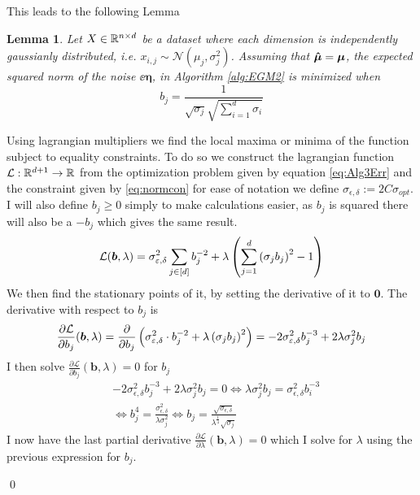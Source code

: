 \documentclass[a4paper,12pt]{article}
\renewenvironment{proof}{{\textit{Proof} \\}}{\qed}
\newtheorem{lemma}{Lemma}[section]
\begin{document}
\noindent This leads to the following Lemma

\begin{lemma}
\label{lem:Optb}
Let $X \in \mathbb{R}^{n \times d}$ be a dataset where each dimension is independently gaussianly distributed, i.e.
$x_{i,j} \sim \mathcal{N}(\mu_j, \sigma_j^2)$.
Assuming that $\bm{\hat{\mu}} = \bm{\mu}$, the expected squared norm of the noise $\ee{\bm{\eta}}$, 
in Algorithm \ref{alg:EGM2} is minimized when
\[
    b_j = \frac{1}{\sqrt{\sigma_j} \sqrt{\sum_{i=1}^d \sigma_i}}
\]
\end{lemma}
\begin{proof}
Using lagrangian multipliers we find the local maxima or 
minima of the function subject to equality constraints.
To do so we construct the lagrangian function $\mathcal{L}: \mathbb{R}^{d+1} \rightarrow \mathbb{R}$ from the optimization problem given by
equation \eqref{eq:Alg3Err} and the constraint given by \eqref{eq:normcon} for ease of notation we define 
$\sigma_{\epsilon, \delta} := 2C\sigma_{opt}$. 
I will also define $b_j \ge 0$ simply to make calculations easier, 
as $b_j$ is squared there will also be a $-b_j$ which gives the same result.
\[
    \mathcal{L}(\bm{b},\lambda) = \sigma_{\varepsilon,\delta}^2\sum_{j \in [d]} b_j^{-2}
    + \lambda \left ( \sum_{j=1}^d \left (\sigma_j b_j\right)^2 - 1\right)
\]
We then find the stationary points of it,
by setting the derivative of it to $\bm{0}$.
The derivative with respect to $b_j$ is 
\[
    \frac{\partial \mathcal{L}}{\partial b_j} (\bm{b}, \lambda)= 
    \frac{\partial}{\partial b_j} \left (\sigma_{\varepsilon,\delta}^2 \cdot b_j^{-2}
    + \lambda \left (\sigma_j b_j\right)^2\right) =
    -2 \sigma_{\varepsilon,\delta}^2 b_j^{-3} + 2 \lambda \sigma_j^2b_j
\]
I then solve $\frac{\partial \mathcal{L}}{\partial b_j}(\bm{b},\lambda) = 0$ for $b_j$
\begin{align}
\nonumber
    &-2\sigma_{\epsilon,\delta}^2 b_j^{-3} + 2 \lambda \sigma_j^2b_j = 0 \iff
    \lambda \sigma_j^2b_j = \sigma_{\epsilon,\delta}^2 b_i^{-3}  \\
\label{eq:solvbi}
    &\iff b_j^4 = \frac{\sigma_{\epsilon,\delta}^2}{\lambda \sigma_j^2} \iff 
    b_j = \frac{\sqrt{\sigma_{\epsilon,\delta}}}{\lambda^{\frac{1}{4}} \sqrt{\sigma_j}} 
\end{align}
I now have the last partial derivative 
$\frac{\partial \mathcal{L}}{\partial \lambda}(\bm{b},\lambda) = 0$ which I solve for
$\lambda$ using the previous expression for $b_j$.


\end{proof}
\end{document}
